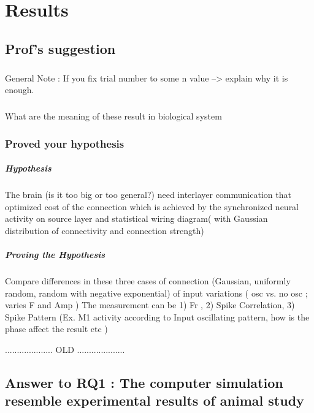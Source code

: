 \chapter{Results}





\section{Prof's suggestion}
\paragraph{}General Note : If you fix trial number to some n value --> explain why it is enough.  
\paragraph{}What are the meaning of these result in biological system
\subsection{Proved your hypothesis}
\paragraph{Hypothesis}  The brain (is it too big or too general?) need interlayer communication that optimized cost of the connection 
which is achieved by the synchronized neural activity on source layer and statistical wiring diagram( with Gaussian distribution of connectivity and connection strength)

\paragraph{Proving the Hypothesis}  Compare differences in these three cases of connection (Gaussian, uniformly random, random with negative exponential) of input variations
 ( osc  vs. no osc  ; varies F and Amp ) 
 The measurement can be  1) Fr ,  2) Spike Correlation, 3) Spike Pattern (Ex. M1 activity according to Input oscillating pattern, how is the phase affect the result etc )

\begin{center}
....................
OLD
....................
\end{center}
\section{ Answer to RQ1 : The computer simulation resemble experimental results of animal study}

